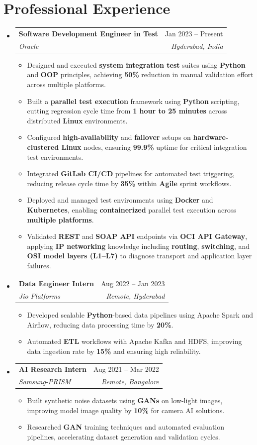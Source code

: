 \documentclass[letterpaper,11pt]{article}
\makeatletter
\newcommand{\resumeItem}[1]{
  \item\small{
    {#1 \vspace{-2pt}}
  }
}
\newcommand{\resumeSubheading}[4]{
  \vspace{-2pt}\item
    \begin{tabular*}{0.97\textwidth}[t]{l@{\extracolsep{\fill}}r}
      \textbf{#1} & #2 \\
      \textit{\small#3} & \textit{\small #4} \\
    \end{tabular*}\vspace{-7pt}
}
\newcommand{\resumeSubHeadingListStart}{\begin{itemize}[leftmargin=0.15in, label={}]}
\newcommand{\resumeSubHeadingListEnd}{\end{itemize}}
\newcommand{\resumeItemListStart}{\begin{itemize}}
\newcommand{\resumeItemListEnd}{\end{itemize}\vspace{-5pt}}
\makeatother
\begin{document}
\section{Professional Experience}
\resumeSubHeadingListStart
    \resumeSubheading
      {Software Development Engineer in Test}{Jan 2023 -- Present}
      {Oracle}{Hyderabad, India}
      \resumeItemListStart
        \resumeItem{Designed and executed \textbf{system integration test} suites using \textbf{Python} and \textbf{OOP} principles, achieving \textbf{50\%} reduction in manual validation effort across multiple platforms.}
        \resumeItem{Built a \textbf{parallel test execution} framework using \textbf{Python} scripting, cutting regression cycle time from \textbf{1 hour to 25 minutes} across distributed \textbf{Linux} environments.}
        \resumeItem{Configured \textbf{high-availability} and \textbf{failover} setups on \textbf{hardware-clustered Linux} nodes, ensuring \textbf{99.9\%} uptime for critical integration test environments.}
        \resumeItem{Integrated \textbf{GitLab CI/CD} pipelines for automated test triggering, reducing release cycle time by \textbf{35\%} within \textbf{Agile} sprint workflows.}
        \resumeItem{Deployed and managed test environments using \textbf{Docker} and \textbf{Kubernetes}, enabling \textbf{containerized} parallel test execution across \textbf{multiple platforms}.}
        \resumeItem{Validated \textbf{REST} and \textbf{SOAP API} endpoints via \textbf{OCI API Gateway}, applying \textbf{IP networking} knowledge including \textbf{routing}, \textbf{switching}, and \textbf{OSI model layers (L1--L7)} to diagnose transport and application layer failures.}
      \resumeItemListEnd
    \resumeSubheading
      {Data Engineer Intern}{Aug 2022 -- Jan 2023}
      {Jio Platforms}{Remote, Hyderabad}
      \resumeItemListStart
        \resumeItem{Developed scalable \textbf{Python}-based data pipelines using Apache Spark and Airflow, reducing data processing time by \textbf{20\%}.}
        \resumeItem{Automated \textbf{ETL} workflows with Apache Kafka and HDFS, improving data ingestion rate by \textbf{15\%} and ensuring high reliability.}
      \resumeItemListEnd
    \resumeSubheading
      {AI Research Intern}{Aug 2021 -- Mar 2022}
      {Samsung-PRISM}{Remote, Bangalore}
      \resumeItemListStart
        \resumeItem{Built synthetic noise datasets using \textbf{GANs} on low-light images, improving model image quality by \textbf{10\%} for camera AI solutions.}
        \resumeItem{Researched \textbf{GAN} training techniques and automated evaluation pipelines, accelerating dataset generation and validation cycles.}
      \resumeItemListEnd
\resumeSubHeadingListEnd
\end{document}

